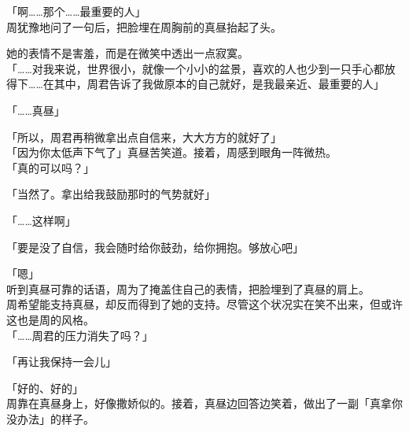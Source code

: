 「啊……那个……最重要的人」\\

周犹豫地问了一句后，把脸埋在周胸前的真昼抬起了头。

她的表情不是害羞，而是在微笑中透出一点寂寞。\\

「……对我来说，世界很小，就像一个小小的盆景，喜欢的人也少到一只手心都放得下……在其中，周君告诉了我做原本的自己就好，是我最亲近、最重要的人」

「……真昼」

「所以，周君再稍微拿出点自信来，大大方方的就好了」\\

「因为你太低声下气了」真昼苦笑道。接着，周感到眼角一阵微热。\\

「真的可以吗？」

「当然了。拿出给我鼓励那时的气势就好」

「……这样啊」

「要是没了自信，我会随时给你鼓劲，给你拥抱。够放心吧」

「嗯」\\

听到真昼可靠的话语，周为了掩盖住自己的表情，把脸埋到了真昼的肩上。\\

周希望能支持真昼，却反而得到了她的支持。尽管这个状况实在笑不出来，但或许这也是周的风格。\\

「……周君的压力消失了吗？」

「再让我保持一会儿」

「好的、好的」\\

周靠在真昼身上，好像撒娇似的。接着，真昼边回答边笑着，做出了一副「真拿你没办法」的样子。
